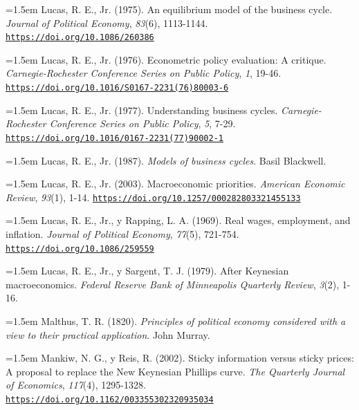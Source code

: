 \documentclass[10pt,a4paper]{article}
\begin{document}
\noindent\hangindent=1.5em Lucas, R. E., Jr. (1975). An equilibrium model of the business cycle. \textit{Journal of Political Economy}, \textit{83}(6), 1113-1144. \href{https://doi.org/10.1086/260386}{\nolinkurl{https://doi.org/10.1086/260386}}

\noindent\hangindent=1.5em Lucas, R. E., Jr. (1976). Econometric policy evaluation: A critique. \textit{Carnegie-Rochester Conference Series on Public Policy}, \textit{1}, 19-46. \href{https://doi.org/10.1016/S0167-2231(76)80003-6}{\nolinkurl{https://doi.org/10.1016/S0167-2231(76)80003-6}}

{\sloppy\noindent\hangindent=1.5em Lucas, R. E., Jr. (1977). Understanding business cycles. \textit{Carnegie-Rochester Conference Series on Public Policy}, \textit{5}, 7-29. \href{https://doi.org/10.1016/0167-2231(77)90002-1}{\nolinkurl{https://doi.org/10.1016/0167-2231(77)90002-1}}\par}

\noindent\hangindent=1.5em Lucas, R. E., Jr. (1987). \textit{Models of business cycles}. Basil Blackwell.

{\sloppy\noindent\hangindent=1.5em Lucas, R. E., Jr. (2003). Macroeconomic priorities. \textit{American Economic Review}, \textit{93}(1), 1-14. \href{https://doi.org/10.1257/000282803321455133}{\nolinkurl{https://doi.org/10.1257/000282803321455133}}\par}

\noindent\hangindent=1.5em Lucas, R. E., Jr., y Rapping, L. A. (1969). Real wages, employment, and inflation. \textit{Journal of Political Economy}, \textit{77}(5), 721-754. \href{https://doi.org/10.1086/259559}{\nolinkurl{https://doi.org/10.1086/259559}}

\noindent\hangindent=1.5em Lucas, R. E., Jr., y Sargent, T. J. (1979). After Keynesian macroeconomics. \textit{Federal Reserve Bank of Minneapolis Quarterly Review}, \textit{3}(2), 1-16.

\noindent\hangindent=1.5em Malthus, T. R. (1820). \textit{Principles of political economy considered with a view to their practical application}. John Murray.

{\sloppy\noindent\hangindent=1.5em Mankiw, N. G., y Reis, R. (2002). Sticky information versus sticky prices: A proposal to replace the New Keynesian Phillips curve. \textit{The Quarterly Journal of Economics}, \textit{117}(4), 1295-1328. \href{https://doi.org/10.1162/003355302320935034}{\nolinkurl{https://doi.org/10.1162/003355302320935034}}\par}
\end{document}
